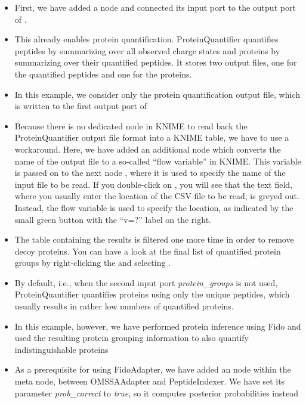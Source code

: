 \begin{itemize}
\item First, we have added a  node and connected its input port to the output port of .
\item This already enables protein quantification. ProteinQuantifier quantifies peptides by summarizing over all observed charge states and proteins
by summarizing over their quantified peptides. It stores two output files, one for the quantified peptides and one for the proteins.
\item In this example, we consider only the protein quantification output file, which is written to the first output port of 
\item Because there is no dedicated node in KNIME to read back the ProteinQuantifier output file format into a KNIME table, we have to use a workaround.
Here, we have added an additional
 node which converts the name of the output file to a so-called ``flow variable'' in KNIME. This variable is passed on
to the next node , where it is used to specify the name of the input file to be read. If you double-click on ,
you will see that the text field, where you usually enter the location of the CSV file to be read, is greyed out. Instead, the flow variable is used
to specify the location, as indicated by the small green button with the ``v=?'' label on the right.
\item The table containing the  results is filtered one more time in order to remove decoy proteins. You can have a look
at the final list of quantified protein groups by right-clicking the  and selecting .
\item By default, i.e., when the second input port \textit{protein\_groups} is not used, ProteinQuantifier quantifies proteins using only the unique peptides,
which usually results in rather low numbers of quantified proteins.
\item In this example, however, we have performed protein inference using Fido and used the resulting protein grouping information to also quantify
indistinguishable proteins
\item As a prerequisite for using FidoAdapter, we have added an  node within the  meta node, between
OMSSAAdapter and PeptideIndexer. We have set its parameter \textit{prob\_correct} to \textit{true}, so it computes posterior probabilities instead

\end{itemize}
